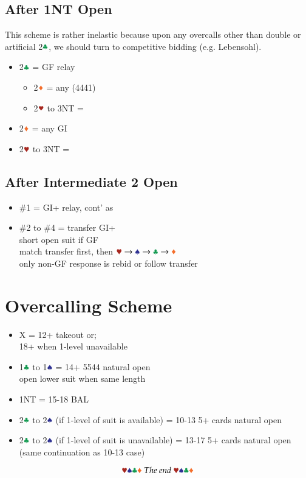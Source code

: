 \documentclass{article}
\newcommand*{\ccc}{\textcolor{ForestGreen}{\clubsuit}}
\newcommand*{\ddd}{\textcolor{Orange}{\vardiamondsuit}}
\newcommand*{\hhh}{\textcolor{Mahogany}{\varheartsuit}}
\newcommand*{\sss}{\textcolor{Blue}{\spadesuit}}
\begin{document}
\begin{multicols}{2}
\subsection{After 1NT Open}
This scheme is rather inelastic because upon any overcalls other than double or artificial 2$\ccc$, we should turn to competitive bidding (e.g. Lebensohl).

\begin{itemize}
    \setlength\itemsep{-0.2em}
    \item 2$\ccc$ = GF relay
    \begin{itemize}
        \setlength\itemsep{-0.2em}
        \item 2$\ddd$ = any (4441)
        \item 2$\hhh$ to 3NT = 
    \end{itemize}
    \item 2$\ddd$ = any GI
    \item 2$\hhh$ to 3NT = 
\end{itemize}

\subsection{After Intermediate 2 Open}
\begin{itemize}
    \setlength\itemsep{-0.2em}
    \item \#1 = GI+ relay, cont' as 
    \item \#2 to \#4 = transfer GI+ \\
        short open suit if GF \\
        match transfer first, then $\hhh \rightarrow \sss \rightarrow \ccc \rightarrow \ddd$ \\
        only non-GF response is rebid or follow transfer
        
\end{itemize}

\section{Overcalling Scheme}
\begin{itemize}
    \setlength\itemsep{-0.2em}
    \item X = 12+ takeout or; \\
        18+ when 1-level unavailable
    \item 1$\ccc$ to 1$\sss$ = 14+ 5544 natural open \\
        open lower suit when same length
    \item 1NT = 15-18 BAL
    \item 2$\ccc$ to 2$\sss$ (if 1-level of suit is available) = 10-13 5+ cards natural open
    \item 2$\ccc$ to 2$\sss$ (if 1-level of suit is unavailable) = 13-17 5+ cards natural open (same continuation as 10-13 case)
\end{itemize}

\columnbreak
$$\hhh\sss\ccc\ddd~The~end~\hhh\sss\ccc\ddd$$

\end{multicols}
\end{document}
